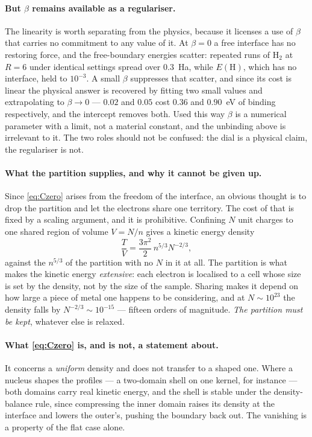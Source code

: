 \documentclass[11pt]{article}
\begin{document}
\paragraph{But $\beta$ remains available as a regulariser.} The linearity is worth separating from the
physics, because it licenses a use of $\beta$ that carries no commitment to any value of it. At
$\beta=0$ a free interface has no restoring force, and the free-boundary energies scatter: repeated
runs of $\mathrm{H}_2$ at $R=6$ under identical settings spread over $0.3$~Ha, while $E(\mathrm{H})$,
which has no interface, held to $10^{-3}$. A small $\beta$ suppresses that scatter, and since its cost
is linear the physical answer is recovered by fitting two small values and extrapolating to
$\beta\to0$ --- $0.02$ and $0.05$ cost $0.36$ and $0.90$~eV of binding respectively, and the intercept
removes both. Used this way $\beta$ is a numerical parameter with a limit, not a material constant,
and the unbinding above is irrelevant to it. The two roles should not be confused: the dial is a
physical claim, the regulariser is not.

\paragraph{What the partition supplies, and why it cannot be given up.} Since \eqref{eq:Czero}
arises from the freedom of the interface, an obvious thought is to drop the partition and let the
electrons share one territory. The cost of that is fixed by a scaling argument, and it is
prohibitive. Confining $N$ unit charges to one shared region of volume $V=N/n$ gives a kinetic energy
density
\begin{equation}\label{eq:scaling}
\frac{T}{V}=\frac{3\pi^2}{2}\,n^{5/3}N^{-2/3},
\end{equation}
against the $n^{5/3}$ of the partition with no $N$ in it at all. The partition is what makes the
kinetic energy \emph{extensive}: each electron is localised to a cell whose size is set by the
density, not by the size of the sample. Sharing makes it depend on how large a piece of metal one
happens to be considering, and at $N\sim10^{23}$ the density falls by $N^{-2/3}\sim10^{-15}$ ---
fifteen orders of magnitude. \emph{The partition must be kept}, whatever else is relaxed.

\paragraph{What \eqref{eq:Czero} is, and is not, a statement about.} It concerns a \emph{uniform}
density and does not transfer to a shaped one. Where a nucleus shapes the profiles --- a two-domain
shell on one kernel, for instance --- both domains carry real kinetic energy, and the shell is stable
under the density-balance rule, since compressing the inner domain raises its density at the
interface and lowers the outer's, pushing the boundary back out. The vanishing is a property of the
flat case alone.
\end{document}
